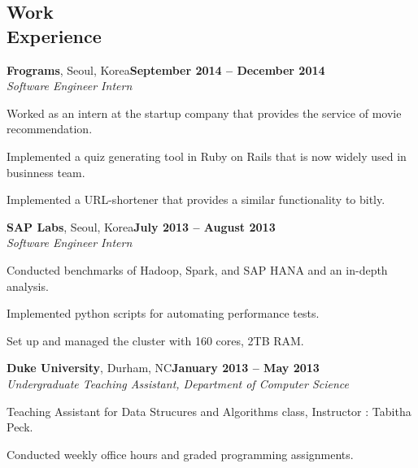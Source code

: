 \documentclass[10pt,margin,line]{resume}
\begin{document}
\begin{resume}
    \section{\mysidestyle Work\\Experience}
    \textbf{Frograms}, Seoul, Korea\hfill \textbf{September 2014 -- December 2014} \vspace{0mm}\\\vspace{0mm}%
    \textsl{Software Engineer Intern}
    \vspace{-3mm}\\\vspace{-1mm}%
    \begin{list3}
        \item Worked as an intern at the startup company that provides the service of movie recommendation.
        \item Implemented a quiz generating tool in Ruby on Rails that is now widely used in businness team.
        \item Implemented a URL-shortener that provides a similar functionality to bitly.
    \end{list3}

    \textbf{SAP Labs}, Seoul, Korea\hfill \textbf{July 2013 -- August 2013} \vspace{0mm}\\\vspace{0mm}%
    \textsl{Software Engineer Intern}
    \vspace{-3mm}\\\vspace{-1mm}%
    \begin{list3}
        \item Conducted benchmarks of Hadoop, Spark, and SAP HANA and an in-depth analysis.
        \item Implemented python scripts for automating performance tests.
        \item Set up and managed the cluster with 160 cores, 2TB RAM.
	\end{list3}

    \textbf{Duke University}, Durham, NC\hfill \textbf{January 2013 -- May 2013} \vspace{0mm}\\\vspace{0mm}%
    \textsl{Undergraduate Teaching Assistant, Department of Computer Science}
    \begin{list3}
        \item Teaching Assistant for Data Strucures and Algorithms class, Instructor : Tabitha Peck.
        \item Conducted weekly office hours and graded programming assignments.
	\end{list3}


\end{resume}
\end{document}
